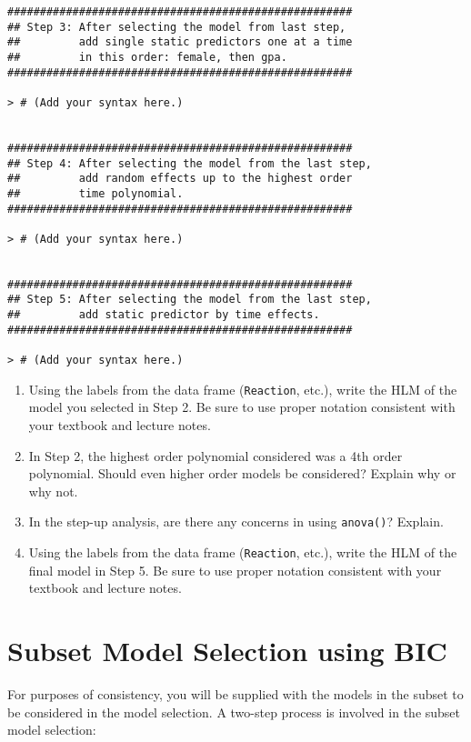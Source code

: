 \documentclass[]{article}
\begin{document}
\pagebreak
\begin{shaded}
\begin{lstlisting}
#####################################################
## Step 3: After selecting the model from last step,
##         add single static predictors one at a time
##         in this order: female, then gpa.
#####################################################

> # (Add your syntax here.)


#####################################################
## Step 4: After selecting the model from the last step,
##         add random effects up to the highest order
##         time polynomial.
#####################################################

> # (Add your syntax here.)


#####################################################
## Step 5: After selecting the model from the last step,
##         add static predictor by time effects.
#####################################################

> # (Add your syntax here.)
\end{lstlisting}
\end{shaded}

\begin{enumerate}
\item Using the labels from the data frame (\texttt{Reaction}, etc.), write the HLM of the model you selected in Step 2. Be sure to use proper notation consistent with your textbook and lecture notes.
\item In Step 2, the highest order polynomial considered was a 4th order polynomial. Should even higher order models be considered? Explain why or why not.
\item In the step-up analysis, are there any concerns in using \texttt{anova()}? Explain.
\item Using the labels from the data frame (\texttt{Reaction}, etc.), write the HLM of the final model in Step 5. Be sure to use proper notation consistent with your textbook and lecture notes.
\end{enumerate}


\section*{Subset Model Selection using BIC}
\label{sec:BIC}

For purposes of consistency, you will be supplied with the models in the subset to be considered in
the model selection. A two-step process is involved in the subset model selection:
\end{document}
